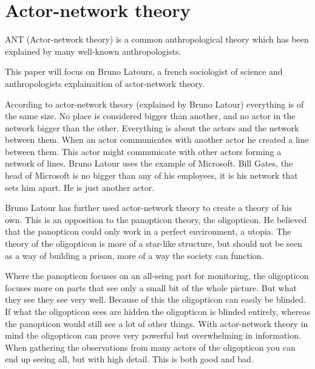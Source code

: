 \section{Actor-network theory}
ANT (Actor-network theory) is a common anthropological theory which has been explained by many well-known anthropologists.

This paper will focus on Bruno Latours, a french sociologist of science and anthropologists explainaition of actor-network theory.

According to actor-network theory (explained by Bruno Latour) everything is of the same size. No place is considered bigger than another, and no actor in the network bigger than the other. Everything is about the actors and the network between them. When an actor communicates with another actor he created a line between them. This actor might communicate with other actors forming a network of lines.
Bruno Latour uses the example of Microsoft. Bill Gates, the head of Microsoft is no bigger than any of his employees, it is his network that sets him apart. He is just another actor.\cite{bookref:actor-network}

Bruno Latour has further used actor-network theory to create a theory of his own. This is an opposition to the panopticon theory, the oligopticon. He believed that the panopticon could only work in a perfect environment, a utopia. The theory of the oligopticon is more of a star-like structure, but should not be seen as a way of building a prison, more of a way the society can function.

Where the panopticon focuses on an all-seing part for monitoring, the oligopticon focuses more on parts that see only a small bit of the whole picture. But what they see they see very well. Because of this the oligopticon can easily be blinded. If what the oligopticon sees are hidden the oligopticon is blinded entirely, whereas the panopticon would still see a lot of other things. With actor-network theory in mind the oligopticon can prove very powerful but overwhelming in information. When gathering the observations from many actors of the oligopticon you can end up seeing all, but with high detail. This is both good and bad.
